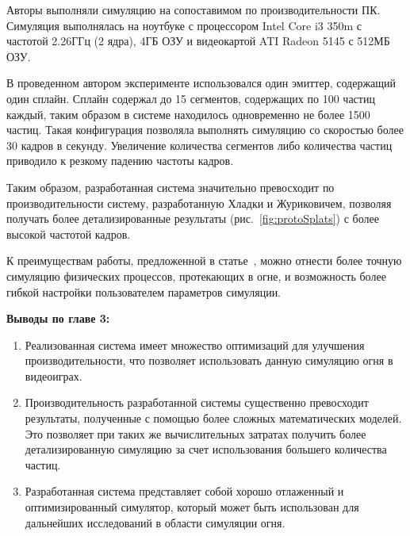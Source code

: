 Авторы выполняли симуляцию на сопоставимом по производительности ПК. Симуляция
выполнялась на ноутбуке с процессором Intel Core i3 350m с частотой 2.26ГГц (2
ядра), 4ГБ ОЗУ и видеокартой ATI Radeon 5145 с 512МБ ОЗУ.

В проведенном автором эксперименте использовался один эмиттер, содержащий один
сплайн. Сплайн содержал до 15 сегментов, содержащих по 100 частиц каждый, таким
образом в системе находилось одновременно не более 1500 частиц. Такая
конфигурация позволяла выполнять симуляцию со скоростью более 30 кадров в
секунду. Увеличение количества сегментов либо количества частиц приводило к
резкому падению частоты кадров.

Таким образом, разработанная система значительно превосходит по
производительности систему, разработанную Хладки и Журиковичем, позволяя
получать более детализированные результаты (рис.~\ref{fig:protoSplats}) с более
высокой частотой кадров.

К преимуществам работы, предложенной в статье~\cite{turbulence}, можно отнести
более точную симуляцию физических процессов, протекающих в огне, и возможность
более гибкой настройки пользователем параметров симуляции.

\textbf{Выводы по главе 3:}
\begin{enumerate}
    \item Реализованная система имеет множество оптимизаций для улучшения
        производительности, что позволяет использовать данную симуляцию огня в
        видеоиграх.
    \item Производительность разработанной системы существенно превосходит результаты,
        полученные с помощью более сложных математических моделей. Это позволяет
        при таких же вычислительных затратах получить более детализированную
        симуляцию за счет использования большего количества частиц.
    \item Разработанная система представляет собой хорошо отлаженный и
        оптимизированный симулятор, который может быть использован для
        дальнейших исследований в области симуляции огня.
\end{enumerate}
